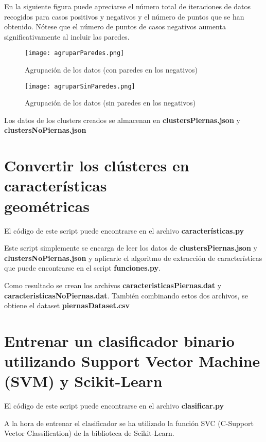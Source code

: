 En la siguiente figura puede apreciarse el número total de iteraciones de datos recogidos para casos positivos y negativos y el número de puntos que se han obtenido. Nótese que el número de puntos de casos negativos aumenta significativamente al incluir las paredes.

\begin{figure}[H]
	\centering
	\texttt{[image: agruparParedes.png]}
	\caption{Agrupación de los datos (con paredes en los negativos)}
\end{figure}
\begin{figure}[H]
	\centering
	\texttt{[image: agruparSinParedes.png]}
	\caption{Agrupación de los datos (sin paredes en los negativos)}
\end{figure}

Los datos de los clusters creados se almacenan en \textbf{clustersPiernas.json} y \textbf{clustersNoPiernas.json}

\section{Convertir los clústeres en características \\ geométricas}

El código de este script puede encontrarse en el archivo \textbf{características.py}

Este script simplemente se encarga de leer los datos de \textbf{clustersPiernas.json} y \textbf{clustersNoPiernas.json} y aplicarle el algoritmo de extracción de características que puede encontrarse en el script \textbf{funciones.py}.

Como resultado se crean los archivos \textbf{caracteristicasPiernas.dat} y \textbf{caracteristicasNoPiernas.dat}. También combinando estos dos archivos, se obtiene el dataset \textbf{piernasDataset.csv}

\newpage

\section{Entrenar un clasificador binario utilizando Support Vector Machine (SVM) y Scikit-Learn}

El código de este script puede encontrarse en el archivo \textbf{clasificar.py}

A la hora de entrenar el clasificador se ha utilizado la función SVC (C-Support Vector Classification) de la biblioteca de Scikit-Learn.

